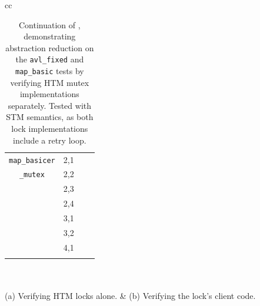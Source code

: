 \begin{table}[t]
\begin{center}
\begin{tabular}{cc}
\begin{tabular}{cc||r|r}
			{\tt map\_basicer}
			& 2,1 & \cpu{14.34} & \ints{9} \\
			{\tt \_mutex}
			& 2,2 & \cpu{147.27} & \ints{2953} \\
			& 2,3 & \cpu{12946.21} & \ints{244691} \\
			& 2,4 & \ETAdag{2d 17h} & \ETAdag{1130184} \\
			& 3,1 & \cpu{637.81} & \ints{12707} \\
			& 3,2 & \ETAdag{102d 13h} & \ETAdag{13220616} \\
			& 4,1 & \ETAdag{33h 33m} & \ETAdag{1778661} \\
			\\
		\end{tabular}
		\\
		\\
		(a) Verifying HTM locks alone.
		&
		(b) Verifying the lock's client code.
		\end{tabular}
	\end{center}
	\caption[Continuation of , demonstrating abstraction reduction.]
		{Continuation of ,
		demonstrating abstraction reduction %
		on the {\tt avl\_fixed} and {\tt map\_basic} tests
		by verifying HTM mutex implementations separately.
		Tested with STM semantics, as both lock implementations include a retry loop.}
	\label{tab:tm-verifs2}
\end{table}

